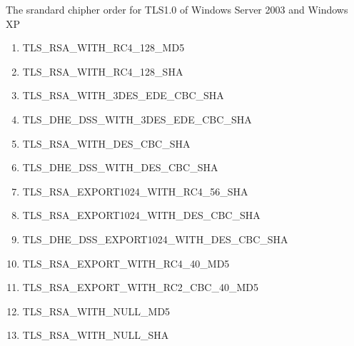 The srandard chipher order for TLS1.0 of Windows Server 2003 and Windows XP
\begin{enumerate}
\item TLS_RSA_WITH_RC4_128_MD5
\item TLS_RSA_WITH_RC4_128_SHA
\item TLS_RSA_WITH_3DES_EDE_CBC_SHA
\item TLS_DHE_DSS_WITH_3DES_EDE_CBC_SHA
\item TLS_RSA_WITH_DES_CBC_SHA
\item TLS_DHE_DSS_WITH_DES_CBC_SHA
\item TLS_RSA_EXPORT1024_WITH_RC4_56_SHA
\item TLS_RSA_EXPORT1024_WITH_DES_CBC_SHA
\item TLS_DHE_DSS_EXPORT1024_WITH_DES_CBC_SHA
\item TLS_RSA_EXPORT_WITH_RC4_40_MD5
\item TLS_RSA_EXPORT_WITH_RC2_CBC_40_MD5
\item TLS_RSA_WITH_NULL_MD5
\item TLS_RSA_WITH_NULL_SHA
\end{enumerate}


